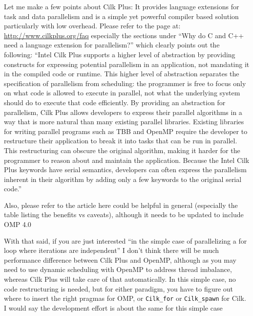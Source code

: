 \documentclass[12pt]{article}
\begin{document}
Let me make a few points about Cilk Plus: It provides language extensions for task and data parallelism and is a simple yet powerful compiler based solution particularly with low overhead. Please refer to the page at:  \url{http://www.cilkplus.org/faq} especially the sections under ``Why do C and C++ need a language extension for parallelism?'' which clearly points out the following:
``Intel Cilk Plus supports a higher level of abstraction by providing constructs for expressing potential parallelism in an application, not mandating it in the compiled code or runtime.   This higher level of abstraction separates the specification of parallelism from scheduling: the programmer is free to focus only on what code is allowed to execute in parallel, not what the underlying system should do to execute that code efficiently. By providing an abstraction for parallelism, Cilk Plus allows developers to express their parallel algorithms in a way that is more natural than many existing parallel libraries. Existing libraries for writing parallel programs such as TBB and OpenMP require the developer to restructure their application to break it into tasks that can be run in parallel.  This restructuring can obscure the original algorithm, making it harder for the programmer to reason about and maintain the application.  Because the Intel Cilk Plus keywords have serial semantics, developers can often express the parallelism inherent in their algorithm by adding only a few keywords to the original serial code.''
 
Also, please refer to the article here could be helpful in general (especially the table listing the benefits vs caveats), although it needs to be updated to include OMP 4.0
 
With that said, if you are just interested ``in the simple case of parallelizing a for loop where iterations are independent'' I don't think there will be much performance difference between Cilk Plus and OpenMP, although as you may need to use dynamic scheduling with OpenMP to address thread imbalance, whereas Cilk Plus will take care of that automatically.  In this simple case, no code restructuring is needed, but for either paradigm, you have to figure out where to insert the right pragmas for OMP, or \verb+Cilk_for+ or \verb+Cilk_spawn+ for Cilk.  I would say the development effort is about the same for this simple case
 
\end{document}
